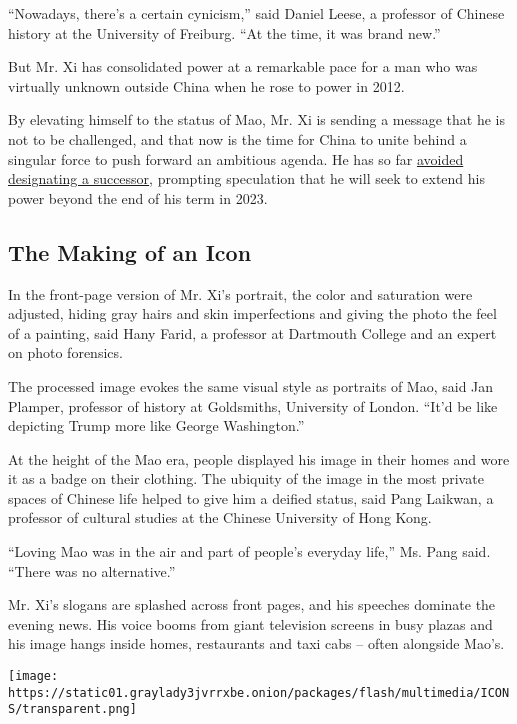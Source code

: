 ``Nowadays, there's a certain cynicism,'' said Daniel Leese, a professor
of Chinese history at the University of Freiburg. ``At the time, it was
brand new.''

But Mr. Xi has consolidated power at a remarkable pace for a man who was
virtually unknown outside China when he rose to power in 2012.

By elevating himself to the status of Mao, Mr. Xi is sending a message
that he is not to be challenged, and that now is the time for China to
unite behind a singular force to push forward an ambitious agenda. He
has so far
\href{https://www.nytimes3xbfgragh.onion/2017/10/24/world/asia/xi-jinping-china.html}{avoided
designating a successor}, prompting speculation that he will seek to
extend his power beyond the end of his term in 2023.

\hypertarget{the-making-of-an-icon}{%
\subsection{The Making of an Icon}\label{the-making-of-an-icon}}

In the front-page version of Mr. Xi's portrait, the color and saturation
were adjusted, hiding gray hairs and skin imperfections and giving the
photo the feel of a painting, said Hany Farid, a professor at Dartmouth
College and an expert on photo forensics.

The processed image evokes the same visual style as portraits of Mao,
said Jan Plamper, professor of history at Goldsmiths, University of
London. ``It'd be like depicting Trump more like George Washington.''

At the height of the Mao era, people displayed his image in their homes
and wore it as a badge on their clothing. The ubiquity of the image in
the most private spaces of Chinese life helped to give him a deified
status, said Pang Laikwan, a professor of cultural studies at the
Chinese University of Hong Kong.

``Loving Mao was in the air and part of people's everyday life,'' Ms.
Pang said. ``There was no alternative.''

Mr. Xi's slogans are splashed across front pages, and his speeches
dominate the evening news. His voice booms from giant television screens
in busy plazas and his image hangs inside homes, restaurants and taxi
cabs -- often alongside Mao's.

\texttt{[image: https://static01.graylady3jvrrxbe.onion/packages/flash/multimedia/ICONS/transparent.png]}

